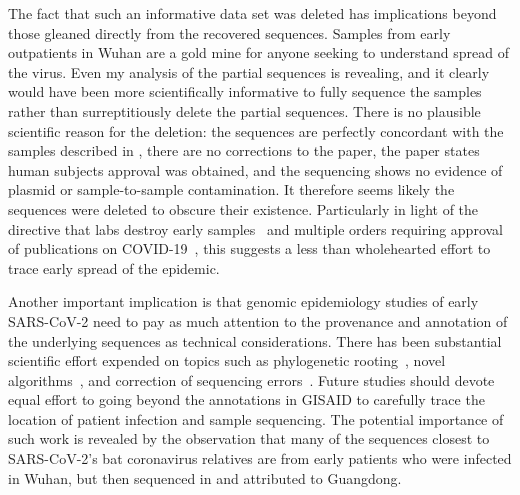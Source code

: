 \documentclass[9pt,twocolumn,twoside]{gsajnl_modified}
\begin{document}
The fact that such an informative data set was deleted has implications beyond those gleaned directly from the recovered sequences.
Samples from early outpatients in Wuhan are a gold mine for anyone seeking to understand spread of the virus.
Even my analysis of the partial sequences is revealing, and it clearly would have been more scientifically informative to fully sequence the samples rather than surreptitiously delete the partial sequences.
There is no plausible scientific reason for the deletion: the sequences are perfectly concordant with the samples described in \citet{wang2020medRxiv,wang2020small}, there are no corrections to the paper, the paper states human subjects approval was obtained, and the sequencing shows no evidence of plasmid or sample-to-sample contamination.
It therefore seems likely the sequences were deleted to obscure their existence.
Particularly in light of the directive that labs destroy early samples~\citep{pinghui2020SCMP} and multiple orders requiring approval of publications on COVID-19~\citep{chinacdc2020, Kang2020}, this suggests a less than wholehearted effort to trace early spread of the epidemic.

Another important implication is that genomic epidemiology studies of early SARS-CoV-2 need to pay as much attention to the provenance and annotation of the underlying sequences as technical considerations.
There has been substantial scientific effort expended on topics such as phylogenetic rooting~\citep{pipes2021assessing, morel2021phylogenetic}, novel algorithms~\citep{kumar2021evolutionary}, and correction of sequencing errors~\citep{turakhia2020stability}.
Future studies should devote equal effort to going beyond the annotations in GISAID to carefully trace the location of patient infection and sample sequencing.
The potential importance of such work is revealed by the observation that many of the sequences closest to SARS-CoV-2's bat coronavirus relatives are from early patients who were infected in Wuhan, but then sequenced in and attributed to Guangdong.
\end{document}
